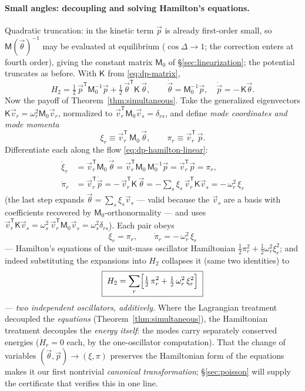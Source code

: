 \documentclass[11pt]{article}
\theoremstyle{plain}
\theoremstyle{definition}
\theoremstyle{remark}
\newcommand{\vp}{\vec{p}}
\newcommand{\vth}{\vec{\theta}}
\newcommand{\mM}{\mathsf{M}}
\newcommand{\mK}{\mathsf{K}}
\begin{document}
\paragraph{Small angles: decoupling and solving Hamilton's equations.}
Quadratic truncation: in the kinetic term $\vp$ is already first-order
small, so $\mM(\vth)^{-1}$ may be evaluated at equilibrium
($\cos\Delta \to 1$; the correction enters at fourth order), giving the
constant matrix $\mM_0$ of \S\ref{sec:linearization}; the potential
truncates as before. With $\mK$ from \eqref{eq:dp-matrix},
\begin{equation}
  H_2 = \tfrac12\,\vp^{\mathsf T}\mM_0^{-1}\vp
  + \tfrac12\,\vth^{\mathsf T}\mK\,\vth,
  \qquad
  \dot\vth = \mM_0^{-1}\vp,
  \quad
  \dot\vp = -\,\mK\vth .
  \label{eq:dp-hamilton-linear}
\end{equation}
Now the payoff of Theorem~\ref{thm:simultaneous}. Take the generalized
eigenvectors $\mK\vec v_r = \omega_r^2\mM_0\vec v_r$, normalized to
$\vec v_r^{\mathsf T}\mM_0\vec v_s = \delta_{rs}$, and define \emph{mode
coordinates and mode momenta}
\begin{equation}
  \xi_r \equiv \vec v_r^{\mathsf T}\,\mM_0\,\vth,
  \qquad
  \pi_r \equiv \vec v_r^{\mathsf T}\,\vp .
\end{equation}
Differentiate each along the flow \eqref{eq:dp-hamilton-linear}:
\begin{align}
  \dot\xi_r &= \vec v_r^{\mathsf T}\mM_0\,\dot\vth
  = \vec v_r^{\mathsf T}\mM_0\,\mM_0^{-1}\vp
  = \vec v_r^{\mathsf T}\vp = \pi_r ,\\
  \dot\pi_r &= \vec v_r^{\mathsf T}\dot\vp
  = -\,\vec v_r^{\mathsf T}\mK\,\vth
  = -\sum_s \xi_s\,\vec v_r^{\mathsf T}\mK\vec v_s
  = -\,\omega_r^2\,\xi_r
\end{align}
(the last step expands $\vth = \sum_s \xi_s\vec v_s$ --- valid because
the $\vec v_s$ are a basis with coefficients recovered by
$\mM_0$-orthonormality --- and uses
$\vec v_r^{\mathsf T}\mK\vec v_s = \omega_s^2\,\vec
v_r^{\mathsf T}\mM_0\vec v_s = \omega_s^2\delta_{rs}$). Each pair obeys
\begin{equation}
  \dot\xi_r = \pi_r,
  \qquad
  \dot\pi_r = -\,\omega_r^2\,\xi_r
\end{equation}
--- Hamilton's equations of the unit-mass oscillator Hamiltonian
$\tfrac12\pi_r^2 + \tfrac12\omega_r^2\xi_r^2$; and indeed substituting
the expansions into $H_2$ collapses it (same two identities) to
\begin{equation}
  \boxed{\;
  H_2 = \sum_{r}\Bigl[\tfrac12\,\pi_r^2
  + \tfrac12\,\omega_r^2\,\xi_r^2\Bigr]
  \;}
\end{equation}
--- \emph{two independent oscillators, additively}. Where the Lagrangian
treatment decoupled the \emph{equations}
(Theorem~\ref{thm:simultaneous}), the Hamiltonian treatment decouples the
\emph{energy itself}: the modes carry separately conserved
energies ($\dot H_r = 0$ each, by the one-oscillator computation). That
the change of variables $(\vth,\vp) \to (\xi,\pi)$ preserves the
Hamiltonian form of the equations makes it our first nontrivial
\emph{canonical transformation}; \S\ref{sec:poisson} will supply the
certificate that verifies this in one line.
\end{document}
